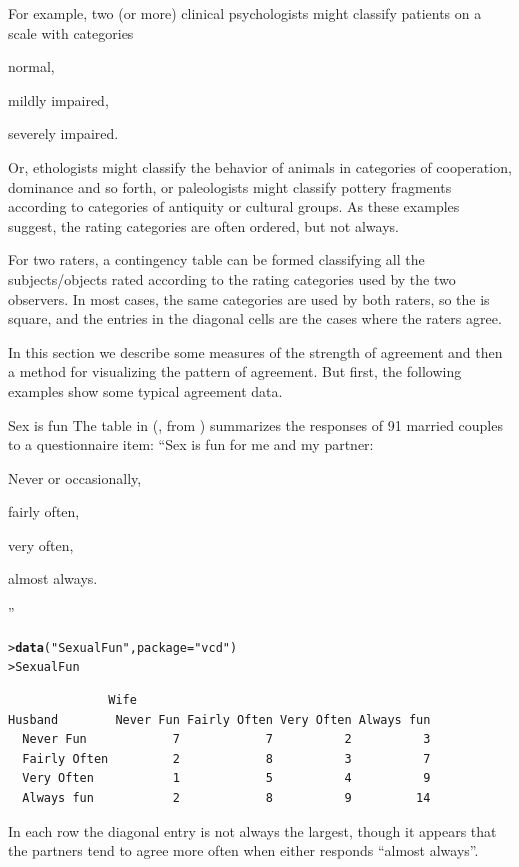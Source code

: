 \documentclass[10pt,krantz2]{krantz}\usepackage[]{graphicx}\usepackage[]{color}
\makeatletter
\newcommand{\hlstr}[1]{\textcolor[rgb]{0.192,0.494,0.8}{#1}}%
\newcommand{\hlstd}[1]{\textcolor[rgb]{0.345,0.345,0.345}{#1}}%
\newcommand{\hlkwc}[1]{\textcolor[rgb]{0.333,0.667,0.333}{#1}}%
\newcommand{\hlkwd}[1]{\textcolor[rgb]{0.737,0.353,0.396}{\textbf{#1}}}%
\newenvironment{kframe}{%
 \def\at@end@of@kframe{}%
 \ifinner\ifhmode%
  \def\at@end@of@kframe{\end{minipage}}%
  \begin{minipage}{\columnwidth}%
 \fi\fi%
 \def\FrameCommand##1{\hskip\@totalleftmargin \hskip-\fboxsep
 \colorbox{shadecolor}{##1}\hskip-\fboxsep
     \hskip-\linewidth \hskip-\@totalleftmargin \hskip\columnwidth}%
 \MakeFramed {\advance\hsize-\width
   \@totalleftmargin\z@ \linewidth\hsize
   \@setminipage}}%
 {\par\unskip\endMakeFramed%
 \at@end@of@kframe}
\newenvironment{knitrout}{}{} %
\renewenvironment{knitrout}{\small\renewcommand{\baselinestretch}{.85}}{} %
\makeatother
\begin{document}
For example, two (or more) clinical psychologists might classify
patients on a scale with categories
\begin{seriate}
\item normal,
\item mildly impaired,
\item severely impaired.
\end{seriate}
Or, ethologists might classify the behavior
of animals in categories of cooperation, dominance and so forth,
or paleologists might classify pottery fragments according to
categories of antiquity or cultural groups. As these examples
suggest, the rating categories are often ordered, but not always.

For two raters, a
contingency table can be
formed classifying all the subjects/objects rated
according to the rating categories used by the two
observers.
In most cases, the same categories are used by both raters,
so the \ctab is square, and the entries in the diagonal cells
are the cases where the raters agree.

In this section we describe some measures of the strength
of agreement and then a method for visualizing the pattern of
agreement.  But first, the following examples show some
typical agreement data.

\begin{Example}[sexisfun1]{Sex is fun}
The  table in 
(\citet[Table 2.10]{Agresti:90}, from \citet{Hout-etal:87})
 summarizes the responses of 91
married couples to a questionnaire item:
``Sex is fun for me and my partner:
\begin{seriate}
  \item Never or occasionally,
  \item fairly often,
  \item very often,
  \item almost always.
\end{seriate}
''
\begin{knitrout}
\color{fgcolor}\begin{kframe}
\begin{alltt}
\hlstd{> }\hlkwd{data}\hlstd{(}\hlstr{"SexualFun"}\hlstd{,} \hlkwc{package} \hlstd{=} \hlstr{"vcd"}\hlstd{)}
\hlstd{> }\hlstd{SexualFun}
\end{alltt}
\begin{verbatim}
              Wife
Husband        Never Fun Fairly Often Very Often Always fun
  Never Fun            7            7          2          3
  Fairly Often         2            8          3          7
  Very Often           1            5          4          9
  Always fun           2            8          9         14
\end{verbatim}
\end{kframe}
\end{knitrout}

In each row the diagonal entry is not always the largest, though it
appears that the partners tend to agree more often when either responds
``almost always''.
%
\end{Example}
\end{document}
